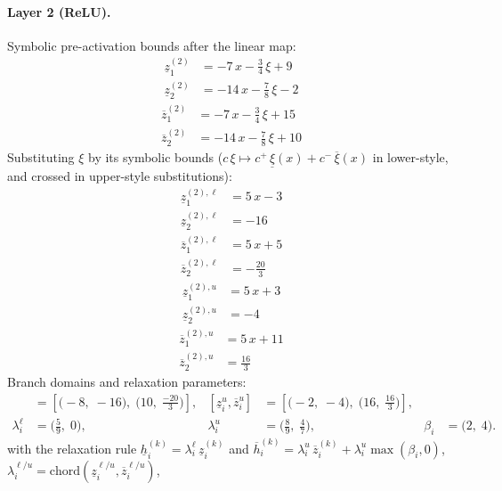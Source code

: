 \documentclass[11pt]{article}
\begin{document}
\paragraph{Layer 2 (ReLU).}
Symbolic pre-activation bounds after the linear map:
\begin{align*}
\underline{z}^{(2)}_{1} &= -7\,x - \frac{3}{4}\,\xi + 9 \\
\underline{z}^{(2)}_{2} &= -14\,x - \frac{7}{8}\,\xi - 2
\end{align*}
\begin{align*}
\overline{z}^{(2)}_{1} &= -7\,x - \frac{3}{4}\,\xi + 15 \\
\overline{z}^{(2)}_{2} &= -14\,x - \frac{7}{8}\,\xi + 10
\end{align*}
Substituting $\xi$ by its symbolic bounds ($c\,\xi \mapsto c^{+}\,\underline{\xi}(x) + c^{-}\,\overline{\xi}(x)$ in lower-style, and crossed in upper-style substitutions):
\begin{align*}
\underline{z}^{(2),\ell}_{1} &= 5\,x - 3 \\
\underline{z}^{(2),\ell}_{2} &= -16
\end{align*}
\begin{align*}
\overline{z}^{(2),\ell}_{1} &= 5\,x + 5 \\
\overline{z}^{(2),\ell}_{2} &= -\frac{20}{3}
\end{align*}
\begin{align*}
\underline{z}^{(2),u}_{1} &= 5\,x + 3 \\
\underline{z}^{(2),u}_{2} &= -4
\end{align*}
\begin{align*}
\overline{z}^{(2),u}_{1} &= 5\,x + 11 \\
\overline{z}^{(2),u}_{2} &= \frac{16}{3}
\end{align*}
Branch domains and relaxation parameters:
\begin{align*}
[\underline{z}^{\ell}_i, \overline{z}^{\ell}_i] &= [\bigl(-8,\; -16\bigr),\; \bigl(10,\; \frac{-20}{3}\bigr)], & [\underline{z}^{u}_i, \overline{z}^{u}_i] &= [\bigl(-2,\; -4\bigr),\; \bigl(16,\; \frac{16}{3}\bigr)], \\
\lambda^{\ell}_i &= \bigl(\frac{5}{9},\; 0\bigr), & \lambda^{u}_i &= \bigl(\frac{8}{9},\; \frac{4}{7}\bigr), & \beta_i &= \bigl(2,\; 4\bigr).
\end{align*}
with the relaxation rule
$\underline{h}^{(k)}_i = \lambda^{\ell}_i\, \underline{z}^{(k)}_i$ and
$\overline{h}^{(k)}_i = \lambda^{u}_i\, \overline{z}^{(k)}_i + \lambda^{u}_i \max(\beta_i, 0)$,
$\lambda^{\ell/u}_i = \mathrm{chord}(\underline{z}_i^{\ell/u}, \overline{z}_i^{\ell/u})$,
\end{document}

